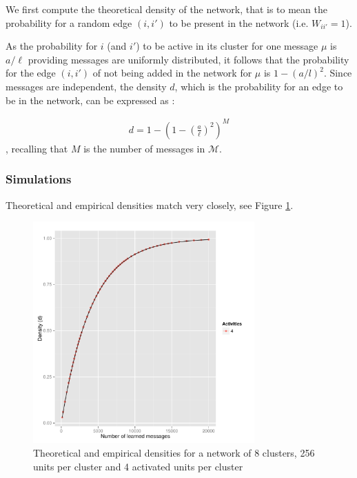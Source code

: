 \documentclass[english,10pt,twocolumn]{IEEEtran}
\theoremstyle{definition}
\begin{document}
	We first compute the theoretical density of the network, that is to mean the probability for a random edge $(i, i')$ to be present in the network (i.e. $W_{ii'} = 1$). 
	
	
	
	
	
	
	
	
	

	
	
	As the probability for $i$ (and $i'$) to be active in its cluster for one message $\mu$ is $a/\ell$ providing messages are uniformly distributed, it follows that the probability for the edge $(i,i')$ of not being added in the network for $\mu$ is $1 - \left(a/l\right)^2$. Since messages are independent, the density $d$, which is the probability for an edge to be in the network, can be expressed as :
	
	\begin{align}
		\label{formula_density}
		d = 1 - \left( 1 - \left(\frac{a}{\ell}\right)^2 \right)^M 
	\end{align}		
	, recalling that $M$ is the number of messages in $\mathcal{M}$.	
	
	\subsubsection{Simulations}
	
	Theoretical and empirical densities match very closely, see Figure \ref{densiteth}. %
	\begin{figure}[!htb]
		\includegraphics[width=8.5cm]{Courbes/remplacement_densite_c8l256a4}
		\caption{Theoretical and empirical densities for a network of 8 clusters, 256 units per cluster and 4 activated units per cluster}
			\label{densiteth}
	\end{figure}	
	
\end{document}
